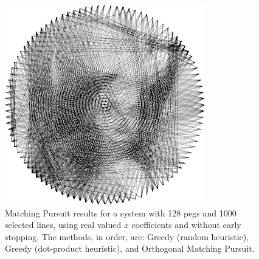 \begin{figure}[H]
\begin{minipage}{0.2\linewidth}
    \end{minipage}
    \begin{minipage}{0.2\linewidth}
        \centering
        \includegraphics[width=\linewidth]{images/mp/omp.png}
    \end{minipage}
    \caption{Matching Pursuit results for a system with 128 pegs and 1000 selected lines, using real valued \(x\) coefficients and without early stopping. The methods, in order, are: Greedy (random heuristic), Greedy (dot-product heuristic), and Orthogonal Matching Pursuit.}
    \label{fig:mp_outputs}
\end{figure}

